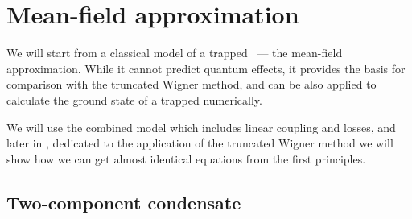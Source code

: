 \section{Mean-field approximation}
\label{sec:bec-noise:mean-field}

We will start from a classical model of a trapped ~--- the mean-field approximation.
While it cannot predict quantum effects, it provides the basis for comparison with the truncated Wigner method, and can be also applied to calculate the ground state of a trapped  numerically.

We will use the combined model which includes linear coupling and losses, and later in , dedicated to the application of the truncated Wigner method we will show how we can get almost identical equations from the first principles.


\subsection{Two-component condensate}

